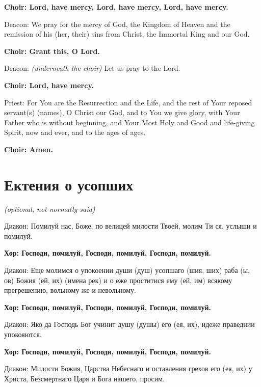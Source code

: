 \documentclass[12pt,a4paper,titlepage]{report}
\begin{document}
\begin{paracol}[1]{2}
  \textbf{Choir: Lord, have mercy, Lord, have mercy, Lord, have mercy.}

  Deacon: We pray for the mercy of God, the Kingdom of Heaven and the remission of his (her, their) sins from Christ, the Immortal King and our God.

  \textbf{Choir: Grant this, O Lord.}

  Deacon: \textit{(underneath the choir)} Let us pray to the Lord.

  \textbf{Choir: Lord, have mercy.}

  Priest: For You are the Resurrection and the Life, and the rest of Your reposed servant(s) (names), O Christ our God, and to You we give glory, with Your Father who is without beginning, and Your Most Holy and Good and life-giving Spirit, now and ever, and to the ages of ages.

  \textbf{Choir: Amen.}

  \switchcolumn[1]

  \section*{Ектения о усопших}

  \indent \textit {\foreignlanguage{english}{(optional, not normally said)}}

  Диакон: Помилуй нас, Боже, по велицей милости Твоей, молим Ти ся, услыши и помилуй.

  \textbf{Хор: Господи, помилуй, Господи, помилуй, Господи, помилуй.}

  Диакон: Еще молимся о упокоении души (душ) усопшаго (шия, ших) раба (ы, ов) Божия (ей, их) (имена рек) и о еже проститися ему (ей, им) всякому прегрешению, вольному же и невольному.

  \textbf{Хор: Господи, помилуй, Господи, помилуй, Господи, помилуй.}

  Диакон: Яко да Господь Бог учинит душу (душы) его (ея, их), идеже праведнии упокояются.

  \textbf{Хор: Господи, помилуй, Господи, помилуй, Господи, помилуй.}

  Диакон: Милости Божия, Царства Небеснаго и оставления грехов его (ея, их) у Христа, Безсмертнаго Царя и Бога нашего, просим.


\end{paracol}
\end{document}
